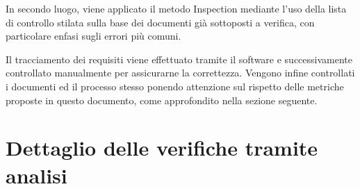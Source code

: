 \documentclass[openany,12pt,a4paper]{report}
\begin{document}
\noindent In secondo luogo, viene applicato il metodo Inspection mediante l'uso della lista di controllo stilata sulla base dei documenti già sottoposti a verifica, con particolare enfasi sugli errori più comuni.

\noindent Il tracciamento dei requisiti viene effettuato tramite il software  e successivamente controllato manualmente per assicurarne la correttezza.
Vengono infine controllati i documenti ed il processo stesso ponendo attenzione sul rispetto delle metriche proposte in questo documento, come approfondito nella sezione seguente.

\section{Dettaglio delle verifiche tramite analisi}
\end{document}
